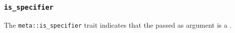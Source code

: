 
\subsubsection{\texttt{is\_specifier}}

The \texttt{meta::is\_specifier}
trait indicates that the  passed as argument is a .


